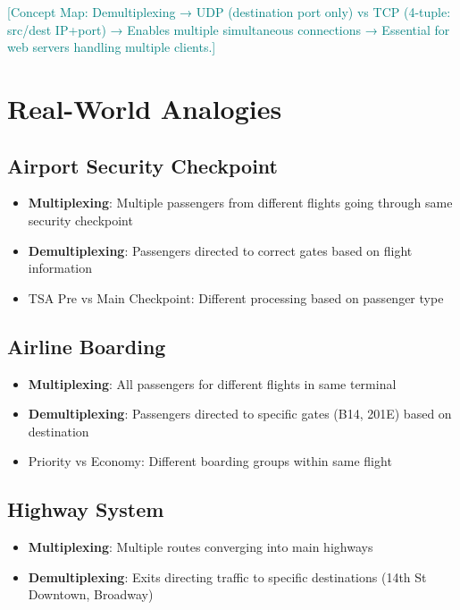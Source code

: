 \documentclass[12pt]{article}
\begin{document}
\textcolor{teal}{[Concept Map: Demultiplexing → UDP (destination port only) vs TCP (4-tuple: src/dest IP+port) → Enables multiple simultaneous connections → Essential for web servers handling multiple clients.]}

\section{Real-World Analogies}

\subsection{Airport Security Checkpoint}
\begin{itemize}
    \item \textbf{Multiplexing}: Multiple passengers from different flights going through same security checkpoint
    \item \textbf{Demultiplexing}: Passengers directed to correct gates based on flight information
    \item TSA Pre vs Main Checkpoint: Different processing based on passenger type
\end{itemize}

\subsection{Airline Boarding}
\begin{itemize}
    \item \textbf{Multiplexing}: All passengers for different flights in same terminal
    \item \textbf{Demultiplexing}: Passengers directed to specific gates (B14, 201E) based on destination
    \item Priority vs Economy: Different boarding groups within same flight
\end{itemize}

\subsection{Highway System}
\begin{itemize}
    \item \textbf{Multiplexing}: Multiple routes converging into main highways
    \item \textbf{Demultiplexing}: Exits directing traffic to specific destinations (14th St Downtown, Broadway)
\end{itemize}
\end{document}
